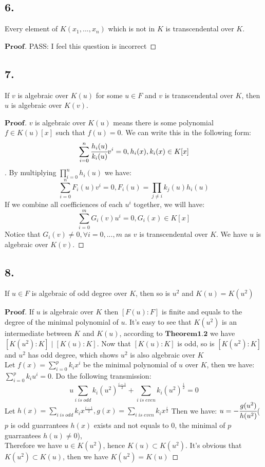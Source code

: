 \documentclass[a4paper, 11pt]{article}
\newenvironment{myprf}
{\renewcommand\qedsymbol{$ $}\begin{proof}[$\textbf{Proof}$]}
  {\end{proof}}
\begin{document}
\subsection*{6.}
Every element of $K(x_1,...,x_n)$ which is not in $K$ is transcendental over $K$.
\begin{myprf}
       PASS: I feel this question is incorrect
\end{myprf}
\subsection*{7.}
If $v$ is algebraic over $K(u)$ for some $u\in F$ and $v$ is transcendental over $K$,
then $u$ is algebraic over $K(v)$.
\begin{myprf}
    $v$ is algebraic over $K(u)$ means there is some polynomial $f\in K(u)[x]$ such that
    $f(u)=0$. We can write this in the following form:
    $$
    \sum_{i=0}^{n}\cfrac{h_i(u)}{k_i(u)} v^{i} = 0, h_i(x),k_i(x)\in K[x]
    $$. By multiplying $\displaystyle \prod_{i=0}^n h_i(u)$ we have:
    $$
    \sum_{i=0}^{n}F_i(u)v^{i}=0, F_i(u)=\prod_{j\neq i}k_j(u)h_i(u)
    $$ If we combine all coefficiences of each $u^i$ together, we will have:
    $$
    \sum_{i=0}^{m}G_i(v)u^i=0, G_i(x)\in K[x]
    $$ Notice that $G_i(v)\neq 0,\forall i=0,...,m$ as $v$ is transcendental over $K$. 
    We have $u$ is algebraic over $K(v)$.
\end{myprf}

\subsection*{8.}
If $u\in F$ is algebraic of odd degree over $K$, then so is $u^2$ and $K(u)=K(u^2)$
\begin{myprf}
        If $u$ is algebraic over $K$ then $[F(u):F]$ is finite and equals to the degree
        of the minimal polynomial of $u$. It's easy to see that $K(u^2)$ is an 
        intermediate between $K$ and $K(u)$, according to $\textbf{Theorem1.2}$ we have
        $[K(u^2):K] \mid [K(u):K]$. Now that $[K(u):K]$ is odd, so is $[K(u^2):K]$ and 
        $u^2$ has odd degree, which shows $u^2$ is also algebraic over $K$\\
        \indent
         Let $f(x)=\displaystyle \sum_{i=0}^{p}k_ix^i$ be the minimal polynomial
        of $u$ over $K$, then we have:$\displaystyle \sum_{i=0}^p k_iu^i=0$. Do the 
        following transmission:
        $$
        u\sum_{i\;is\; odd}k_i(u^2)^{\frac{i-1}{2}}+\sum_{i\; is\; even}k_i(u^2)^
        {\frac{i}{2}} = 0
        $$ Let $\displaystyle h(x)=\sum_{i\;is\;odd}k_ix^{\frac{i-1}{2}},
        g(x)=\sum_{i\;is\;even}k_ix^{\frac{i}{2}}$ Then we have: $u=-\cfrac{g(u^2)}{h(u^2)}$($p$ is odd guarrantees $h(x)$ exists and not equals to 0, the minimal of $p$ guarrantees $h(u)\neq 0$),
        \\\indent Therefore we have $u\in K(u^2)$, hence $K(u)\subset K(u^2)$. It's obvious that
        $K(u^2)\subset K(u)$, then we have $K(u^2)=K(u)$
       
\end{myprf}
\end{document}
